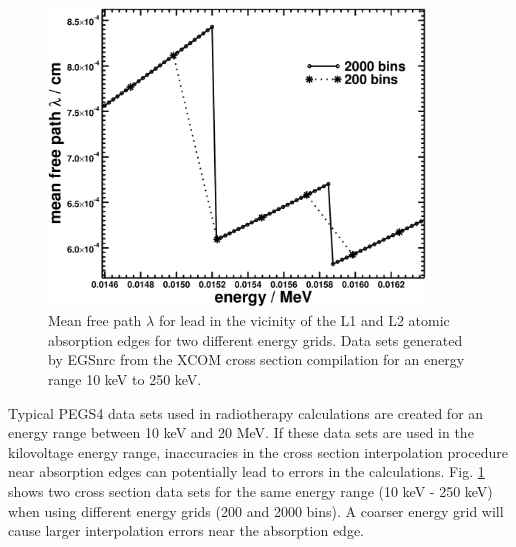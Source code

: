 \begin{figure}[hbtp]
\begin{center}
\includegraphics*[width=10.0cm]{figures/xcom_250keV_zoom}
\end{center}
\caption[Mean free path $\lambda$ for lead in the vicinity
of the L1 and L2 atomic absorption edges for two different
energy grids]
{Mean free path $\lambda$ for lead in the vicinity
of the L1 and L2 atomic absorption edges for two different
energy grids. Data sets generated by EGSnrc from
the XCOM cross section compilation for an energy range
10 keV to 250 keV.
}
\label{accuracy_xsections}
\end{figure}

Typical PEGS4 data sets used in radiotherapy 
calculations are created for an energy range between 10 keV and 20 MeV.
If these data sets are used in the kilovoltage energy 
range, inaccuracies in the cross section interpolation procedure near 
absorption edges can potentially lead to errors in the calculations.
Fig. \ref{accuracy_xsections} shows two cross section data sets 
for the same energy range (10 keV - 250 keV) when using 
different energy grids (200 and 2000 bins). A coarser energy 
grid will cause larger interpolation errors near the absorption edge.

